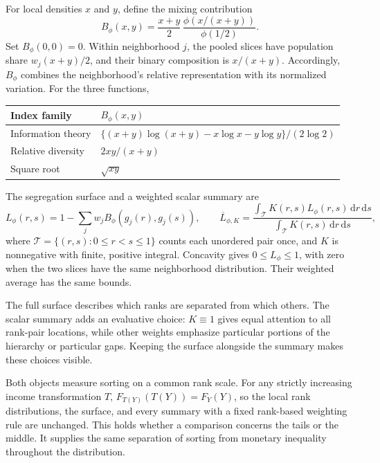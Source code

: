 \documentclass[11pt]{article}
\newcommand{\dd}{\,\mathrm{d}}
\newcommand{\T}{\mathcal{T}}
\begin{document}
For local densities $x$ and $y$, define the mixing contribution
\begin{equation}
B_\phi(x,y)=\frac{x+y}{2}\,
\frac{\phi\!\left(x/(x+y)\right)}{\phi(1/2)}.
\label{eq:mixing}
\end{equation}
Set $B_\phi(0,0)=0$. Within neighborhood $j$, the pooled slices have population share $w_j(x+y)/2$, and their binary composition is $x/(x+y)$. Accordingly, $B_\phi$ combines the neighborhood's relative representation with its normalized variation. For the three functions,
\begin{center}
\begin{tabular}{ll}
\toprule
Index family & $B_\phi(x,y)$\\
\midrule
Information theory & $\{(x+y)\log(x+y)-x\log x-y\log y\}/(2\log2)$\\[3pt]
Relative diversity & $2xy/(x+y)$\\[3pt]
Square root & $\sqrt{xy}$\\
\bottomrule
\end{tabular}
\end{center}
The segregation surface and a weighted scalar summary are
\begin{equation}
L_\phi(r,s)=1-\sum_jw_jB_\phi(g_j(r),g_j(s)),\qquad
\overline L_{\phi,K}=
\frac{\int_{\T}K(r,s)L_\phi(r,s)\dd r\dd s}
{\int_{\T}K(r,s)\dd r\dd s},
\label{eq:surface}
\end{equation}
where $\T=\{(r,s):0\leq r<s\leq1\}$ counts each unordered pair once, and $K$ is nonnegative with finite, positive integral. Concavity gives $0\leq L_\phi\leq1$, with zero when the two slices have the same neighborhood distribution. Their weighted average has the same bounds.

The full surface describes which ranks are separated from which others. The scalar summary adds an evaluative choice: $K\equiv1$ gives equal attention to all rank-pair locations, while other weights emphasize particular portions of the hierarchy or particular gaps. Keeping the surface alongside the summary makes these choices visible.

Both objects measure sorting on a common rank scale. For any strictly increasing income transformation $T$, $F_{T(Y)}(T(Y))=F_Y(Y)$, so the local rank distributions, the surface, and every summary with a fixed rank-based weighting rule are unchanged. This holds whether a comparison concerns the tails or the middle. It supplies the same separation of sorting from monetary inequality throughout the distribution.
\end{document}
